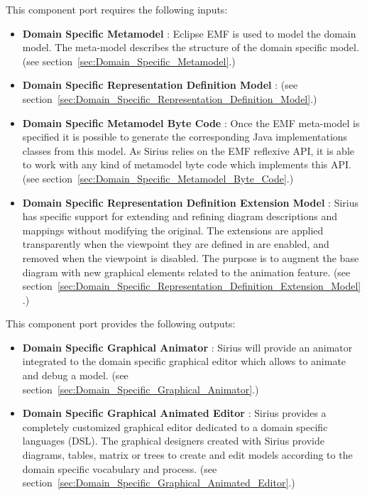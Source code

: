 \documentclass{gemoc} %
\begin{document}
This component port requires the following inputs:
\begin{itemize}
  \item \textbf{Domain Specific Metamodel} :
Eclipse EMF is used to model the domain model. The meta-model describes the structure of the domain specific model.
(see section~\ref{sec:Domain_Specific_Metamodel}.)
  \item \textbf{Domain Specific Representation Definition Model} :
(see section~\ref{sec:Domain_Specific_Representation_Definition_Model}.)
  \item \textbf{Domain Specific Metamodel Byte Code} :
Once the EMF meta-model is specified it is possible to generate the corresponding Java implementations classes from this model. As Sirius relies on the EMF reflexive API, it is able to work with any kind of metamodel byte code which implements this API.
(see section~\ref{sec:Domain_Specific_Metamodel_Byte_Code}.)
  \item \textbf{Domain Specific Representation Definition Extension Model} :
Sirius has specific support for extending and refining diagram descriptions and mappings without modifying the original. The extensions are applied transparently when the viewpoint they are defined in are enabled, and removed when the viewpoint is disabled.  The purpose is to augment the base diagram with new graphical elements related to the animation feature.
(see section~\ref{sec:Domain_Specific_Representation_Definition_Extension_Model}.)
\end{itemize}

This component port provides the following outputs:
\begin{itemize}
  \item \textbf{Domain Specific Graphical Animator} :
Sirius will provide an animator integrated to the domain specific graphical editor which allows to animate and debug a model. 
(see section~\ref{sec:Domain_Specific_Graphical_Animator}.)
  \item \textbf{Domain Specific Graphical Animated Editor} :
Sirius provides a completely customized graphical editor dedicated to a domain specific languages (DSL). The graphical designers created with Sirius provide diagrams, tables, matrix or trees to create and edit models according to the domain specific vocabulary and process.
(see section~\ref{sec:Domain_Specific_Graphical_Animated_Editor}.)
\end{itemize}
\end{document}
